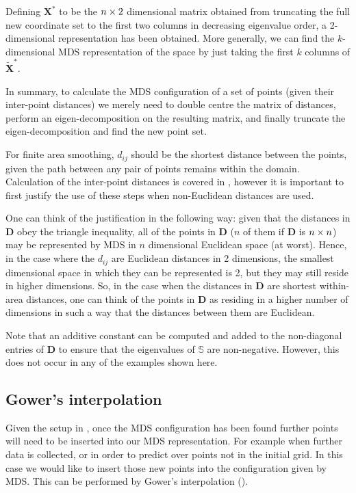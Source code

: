 Defining $\mathbf{X}^*$ to be the $n \times 2$ dimensional matrix obtained from truncating the full new coordinate set to the first two columns in decreasing eigenvalue order, a 2-dimensional representation has been obtained. More generally, we can find the $k$-dimensional MDS representation of the space by just taking the first $k$ columns of $\tilde{\mathbf{X}}^*$.

In summary, to calculate the MDS configuration of a set of points (given their inter-point distances) we merely need to double centre the matrix of distances, perform an eigen-decomposition on the resulting matrix, and finally truncate the eigen-decomposition and find the new point set.

For finite area smoothing, $d_{ij}$ should be the shortest distance between the points, given the path between any pair of points remains within the domain. Calculation of the inter-point distances is covered in , however it is important to first justify the use of these steps when non-Euclidean distances are used. 

One can think of the justification in the following way: given that the distances in $\mathbf{D}$ obey the triangle inequality, all of the points in $\mathbf{D}$ ($n$ of them if $\mathbf{D}$ is $n \times n$) may be represented by MDS in $n$ dimensional Euclidean space (at worst). Hence, in the case where the $d_{ij}$ are Euclidean distances in 2 dimensions, the smallest dimensional space in which they can be represented is 2, but they may still reside in higher dimensions. So, in the case when the distances in $\mathbf{D}$ are shortest within-area distances, one can think of the points in $\mathbf{D}$ as residing in a higher number of dimensions in such a way that the distances between them are Euclidean.

Note that an additive constant can be computed and added to the non-diagonal entries of $\mathbf{D}$ to ensure that the eigenvalues of $\mathbb{S}$ are non-negative. However, this does not occur in any of the examples shown here.

\subsection{Gower's interpolation} 
\label{gowers}
Given the setup in , once the MDS configuration has been found further points will need to be inserted into our MDS representation. For example when further data is collected, or in order to predict over points not in the initial grid. In this case we would like to insert those new points into the configuration given by MDS. This can be performed by Gower's interpolation (\cite{gower1968}).

